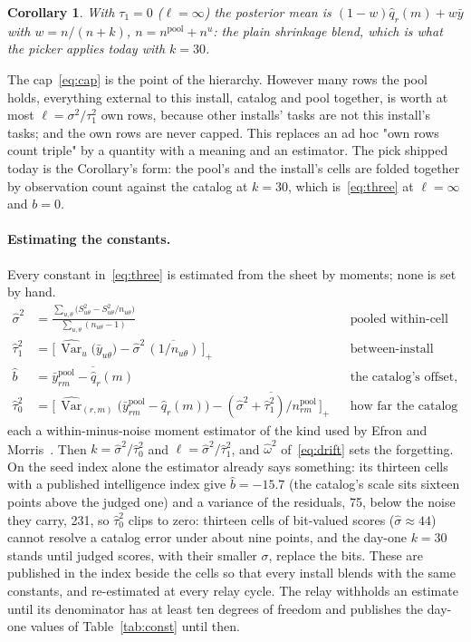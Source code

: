 \documentclass[10pt,a4paper]{article}
\newtheorem{corollary}{Corollary}
\theoremstyle{definition}
\theoremstyle{remark}
\begin{document}
\begin{corollary}
With $\tau_1=0$ ($\ell=\infty$) the posterior mean is $(1-w)\hat q_r(m)+w\bar y$ with $w=n/(n+k)$, $n=n^{\mathrm{pool}}+n^u$: the plain shrinkage blend, which is what the picker applies today with $k=30$.
\end{corollary}

The cap~\eqref{eq:cap} is the point of the hierarchy. However many rows the pool holds, everything external to this install, catalog and pool together, is worth at most $\ell=\sigma^2/\tau_1^2$ own rows, because other installs' tasks are not this install's tasks; and the own rows are never capped. This replaces an ad hoc "own rows count triple" by a quantity with a meaning and an estimator. The pick shipped today is the Corollary's form: the pool's and the install's cells are folded together by observation count against the catalog at $k=30$, which is~\eqref{eq:three} at $\ell=\infty$ and $b=0$.

\paragraph{Estimating the constants.}
Every constant in~\eqref{eq:three} is estimated from the sheet by moments; none is set by hand.
\begin{align}
\hat\sigma^2 &= \frac{\sum_{u,\theta}\big(S^2_{u\theta}-S_{u\theta}^2/n_{u\theta}\big)}{\sum_{u,\theta}(n_{u\theta}-1)} &&\text{pooled within-cell variance,}\label{eq:sigma}\\
\hat\tau_1^2 &= \Big[\,\widehat{\operatorname{Var}}_u\big(\bar y_{u\theta}\big)-\hat\sigma^2\,\overline{(1/n_{u\theta})}\,\Big]_+ &&\text{between-install variance, pooled over cells,}\label{eq:tau1}\\
\hat b &= \overline{\bar y^{\mathrm{pool}}_{rm}-\hat q_r(m)} &&\text{the catalog's offset,}\label{eq:bias}\\
\hat\tau_0^2 &= \Big[\,\widehat{\operatorname{Var}}_{(r,m)}\big(\bar y^{\mathrm{pool}}_{rm}-\hat q_r(m)\big)-\overline{(\hat\sigma^2+\hat\tau_1^2)/n^{\mathrm{pool}}_{rm}}\,\Big]_+ &&\text{how far the catalog misses,}\label{eq:tau0}
\end{align}
each a within-minus-noise moment estimator of the kind used by Efron and Morris~\cite{efron1975}. Then $k=\hat\sigma^2/\hat\tau_0^2$ and $\ell=\hat\sigma^2/\hat\tau_1^2$, and $\hat\omega^2$ of~\eqref{eq:drift} sets the forgetting. On the seed index alone the estimator already says something: its thirteen cells with a published intelligence index give $\hat b=-15.7$ (the catalog's scale sits sixteen points above the judged one) and a variance of the residuals, 75, below the noise they carry, 231, so $\hat\tau_0^2$ clips to zero: thirteen cells of bit-valued scores ($\hat\sigma\approx44$) cannot resolve a catalog error under about nine points, and the day-one $k=30$ stands until judged scores, with their smaller $\sigma$, replace the bits. These are published in the index beside the cells so that every install blends with the same constants, and re-estimated at every relay cycle. The relay withholds an estimate until its denominator has at least ten degrees of freedom and publishes the day-one values of Table~\ref{tab:const} until then.
\end{document}
